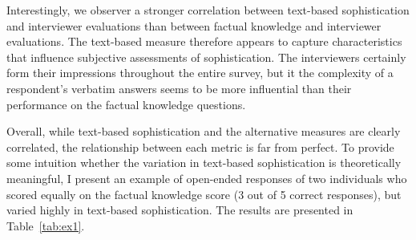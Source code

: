 \documentclass[12pt]{article}
\begin{document}
Interestingly, we observer a stronger correlation between text-based sophistication and interviewer evaluations than between factual knowledge and interviewer evaluations. The text-based measure therefore appears to capture characteristics that influence subjective assessments of sophistication. The interviewers certainly form their impressions throughout the entire survey, but it the complexity of a respondent's verbatim answers seems to be more influential than their performance on the factual knowledge questions.

Overall, while text-based sophistication and the alternative measures are clearly correlated, the relationship between each metric is far from perfect. To provide some intuition whether the variation in text-based sophistication is theoretically meaningful, I present an example of open-ended responses of two individuals who scored equally on the factual knowledge score (3 out of 5 correct responses), but varied highly in text-based sophistication. The results are presented in Table~\ref{tab:ex1}.
\end{document}
